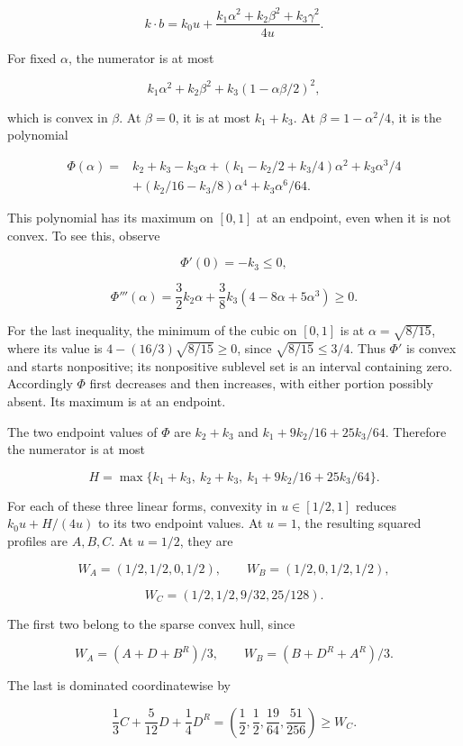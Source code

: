 \[
k\cdot b
=k_0u+\frac{k_1\alpha^2+k_2\beta^2+k_3\gamma^2}{4u}.
\]

For fixed \(\alpha\), the numerator is at most

\[
k_1\alpha^2+k_2\beta^2+k_3(1-\alpha\beta/2)^2,
\]

which is convex in \(\beta\). At \(\beta=0\), it is at most \(k_1+k_3\).
At \(\beta=1-\alpha^2/4\), it is the polynomial

\[
\begin{aligned}
\Phi(\alpha)={}&k_2+k_3-k_3\alpha
+(k_1-k_2/2+k_3/4)\alpha^2
+k_3\alpha^3/4\\
&+(k_2/16-k_3/8)\alpha^4+k_3\alpha^6/64.
\end{aligned}
\]

This polynomial has its maximum on \([0,1]\) at an endpoint, even when it is
not convex. To see this, observe

\[
\Phi'(0)=-k_3\le0,
\]

\[
\Phi'''(\alpha)=\frac32 k_2\alpha
+\frac38 k_3(4-8\alpha+5\alpha^3)\ge0.
\]

For the last inequality, the minimum of the cubic on \([0,1]\) is at
\(\alpha=\sqrt{8/15}\), where its value is
\(4-(16/3)\sqrt{8/15}\ge0\), since \(\sqrt{8/15}\le3/4\).
Thus \(\Phi'\) is convex and starts nonpositive; its nonpositive sublevel
set is an interval containing zero. Accordingly \(\Phi\) first decreases
and then increases, with either portion possibly absent. Its maximum is at an
endpoint.

The two endpoint values of \(\Phi\) are \(k_2+k_3\) and
\(k_1+9k_2/16+25k_3/64\). Therefore the numerator is at most

\[
H=\max\{k_1+k_3,\ k_2+k_3,\ k_1+9k_2/16+25k_3/64\}.
\]

For each of these three linear forms, convexity in \(u\in[1/2,1]\) reduces
\(k_0u+H/(4u)\) to its two endpoint values. At \(u=1\), the resulting
squared profiles are \(A,B,C\). At \(u=1/2\), they are

\[
W_A=(1/2,1/2,0,1/2),\qquad
W_B=(1/2,0,1/2,1/2),
\]

\[
W_C=(1/2,1/2,9/32,25/128).
\]

The first two belong to the sparse convex hull, since

\[
W_A=(A+D+B^R)/3,\qquad
W_B=(B+D^R+A^R)/3.
\]

The last is dominated coordinatewise by

\[
\frac13 C+\frac5{12}D+\frac14D^R
=\left(\frac12,\frac12,\frac{19}{64},\frac{51}{256}\right)
\ge W_C.
\]

